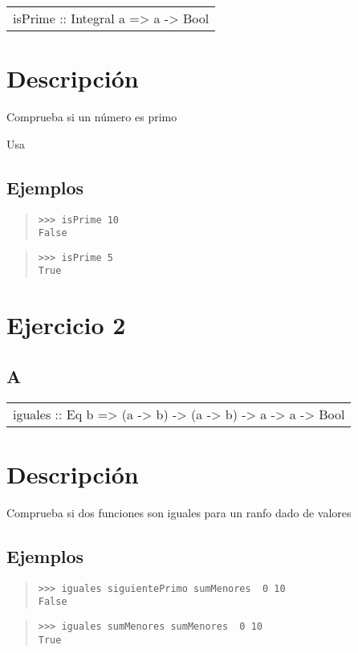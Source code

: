 \begin{haddockdesc}
\item[\begin{tabular}{@{}l}
isPrime :: Integral a => a -> Bool
\end{tabular}]
{\haddockbegindoc
\section*{Descripción}
Comprueba si un número es primo\par
Usa \par
\subsection*{Ejemplos}
\begin{quote}
{\haddockverb\begin{verbatim}
>>> isPrime 10
False

\end{verbatim}}
\end{quote}
\begin{quote}
{\haddockverb\begin{verbatim}
>>> isPrime 5
True

\end{verbatim}}
\end{quote}}
\end{haddockdesc}
\section{Ejercicio 2}
\subsection{A}
\begin{haddockdesc}
\item[\begin{tabular}{@{}l}
iguales :: Eq b => (a -> b) -> (a -> b) -> a -> a -> Bool
\end{tabular}]
{\haddockbegindoc
\section*{Descripción}
Comprueba si dos funciones son iguales para un ranfo dado de valores\par
\subsection*{Ejemplos}
\begin{quote}
{\haddockverb\begin{verbatim}
>>> iguales siguientePrimo sumMenores  0 10
False

\end{verbatim}}
\end{quote}
\begin{quote}
{\haddockverb\begin{verbatim}
>>> iguales sumMenores sumMenores  0 10
True

\end{verbatim}}
\end{quote}}
\end{haddockdesc}

